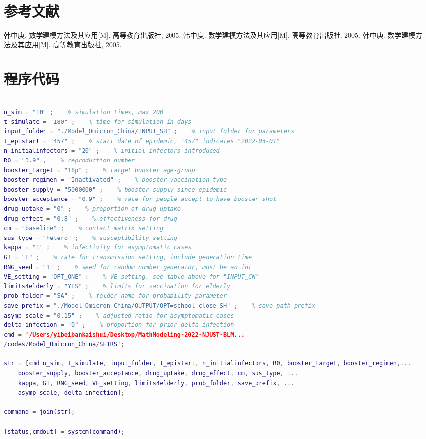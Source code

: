 \documentclass[bwprint]{gmcmthesis}
\numberwithin{figure}{section}
\begin{document}
\section{参考文献}
\begin{thebibliography}{1.2}%
\setlength{\itemsep}{-2mm}
 韩中庚. 数学建模方法及其应用[M]. 高等教育出版社, 2005.
 韩中庚. 数学建模方法及其应用[M]. 高等教育出版社, 2005.
 韩中庚. 数学建模方法及其应用[M]. 高等教育出版社, 2005.
\end{thebibliography}




\newpage
\appendix
\section{程序代码}
\begin{lstlisting}[language=Matlab] 
% 主函数

n_sim = "10" ;    % simulation times, max 200
t_simulate = "180" ;    % time for simulation in days
input_folder = "./Model_Omicron_China/INPUT_SH" ;    % input folder for parameters
t_epistart = "457" ;    % start date of epidemic, "457" indicates "2022-03-01"
n_initialinfectors = "20" ;    % initial infectors introduced
R0 = "3.9" ;    % reproduction number
booster_target = "18p" ;    % target booster age-group
booster_regimen = "Inactivated" ;    % booster vaccination type
booster_supply = "5000000" ;    % booster supply since epidemic
booster_acceptance = "0.9" ;    % rate for people accept to have booster shot
drug_uptake = "0" ;    % proportion of drug uptake
drug_effect = "0.8" ;    % effectiveness for drug
cm = "baseline" ;    % contact matrix setting
sus_type = "hetero" ;    % susceptibility setting
kappa = "1" ;    % infectivity for asymptomatic cases
GT = "L" ;    % rate for transmission setting, include generation time
RNG_seed = "1" ;    % seed for random number generator, must be an int
VE_setting = "OPT_ONE" ;    % VE setting, see table above for "INPUT_CN"
limits4elderly = "YES" ;    % limits for vaccination for elderly
prob_folder = "SA" ;    % folder name for probability parameter
save_prefix = "./Model_Omicron_China/OUTPUT/OPT=school_close_SH" ;    % save path prefix
asymp_scale = "0.15" ;    % adjusted ratio for asymptomatic cases
delta_infection = "0" ;    % proportion for prior delta_infection
cmd = '/Users/yibeibankaishui/Desktop/MathModeling-2022-NJUST-BLM...
/codes/Model_Omicron_China/SEIRS';

str = [cmd n_sim, t_simulate, input_folder, t_epistart, n_initialinfectors, R0, booster_target, booster_regimen,... 
    booster_supply, booster_acceptance, drug_uptake, drug_effect, cm, sus_type, ...
    kappa, GT, RNG_seed, VE_setting, limits4elderly, prob_folder, save_prefix, ...
    asymp_scale, delta_infection];

command = join(str);

[status,cmdout] = system(command);

 \end{lstlisting}
 
\end{document}
